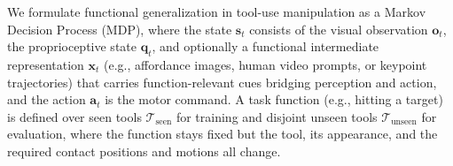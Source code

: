 
We formulate functional generalization in tool-use manipulation as a Markov Decision Process (MDP), where the state $\mathbf{s}_t$ consists of the visual observation $\mathbf{o}_t$, the proprioceptive state $\mathbf{q}_t$, and optionally a functional intermediate representation $\mathbf{x}_t$ (e.g., affordance images, human video prompts, or keypoint trajectories) that carries function-relevant cues bridging perception and action, and the action $\mathbf{a}_t$ is the motor command. A task function (e.g., hitting a target) is defined over seen tools $\mathcal{T}_{\text{seen}}$ for training and disjoint unseen tools $\mathcal{T}_{\text{unseen}}$ for evaluation, where the function stays fixed but the tool, its appearance, and the required contact positions and motions all change.


